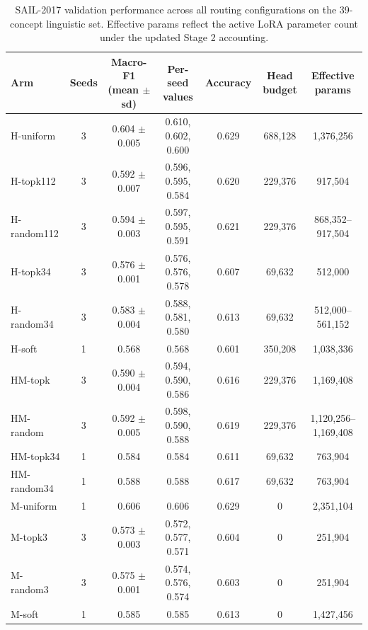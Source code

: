 \begin{table}[t]
\centering
\small
\begin{tabular}{lcccccc}
\toprule
\textbf{Arm} & \textbf{Seeds} & \textbf{Macro-F1 (mean $\pm$ sd)} & \textbf{Per-seed values} & \textbf{Accuracy} & \textbf{Head budget} & \textbf{Effective params} \\
\midrule
H-uniform & 3 & 0.604 $\pm$ 0.005 & 0.610, 0.602, 0.600 & 0.629 & 688,128 & 1,376,256 \\
H-topk112 & 3 & 0.592 $\pm$ 0.007 & 0.596, 0.595, 0.584 & 0.620 & 229,376 & 917,504 \\
H-random112 & 3 & 0.594 $\pm$ 0.003 & 0.597, 0.595, 0.591 & 0.621 & 229,376 & 868,352--917,504 \\
H-topk34 & 3 & 0.576 $\pm$ 0.001 & 0.576, 0.576, 0.578 & 0.607 & 69,632 & 512,000 \\
H-random34 & 3 & 0.583 $\pm$ 0.004 & 0.588, 0.581, 0.580 & 0.613 & 69,632 & 512,000--561,152 \\
H-soft & 1 & 0.568 & 0.568 & 0.601 & 350,208 & 1,038,336 \\
HM-topk & 3 & 0.590 $\pm$ 0.004 & 0.594, 0.590, 0.586 & 0.616 & 229,376 & 1,169,408 \\
HM-random & 3 & 0.592 $\pm$ 0.005 & 0.598, 0.590, 0.588 & 0.619 & 229,376 & 1,120,256--1,169,408 \\
HM-topk34 & 1 & 0.584 & 0.584 & 0.611 & 69,632 & 763,904 \\
HM-random34 & 1 & 0.588 & 0.588 & 0.617 & 69,632 & 763,904 \\
M-uniform & 1 & 0.606 & 0.606 & 0.629 & 0 & 2,351,104 \\
M-topk3 & 3 & 0.573 $\pm$ 0.003 & 0.572, 0.577, 0.571 & 0.604 & 0 & 251,904 \\
M-random3 & 3 & 0.575 $\pm$ 0.001 & 0.574, 0.576, 0.574 & 0.603 & 0 & 251,904 \\
M-soft & 1 & 0.585 & 0.585 & 0.613 & 0 & 1,427,456 \\
\bottomrule
\end{tabular}
\caption{SAIL-2017 validation performance across all routing configurations on the 39-concept linguistic set. Effective params reflect the active LoRA parameter count under the updated Stage 2 accounting.}
\label{tab:stage2_ling}
\end{table}
